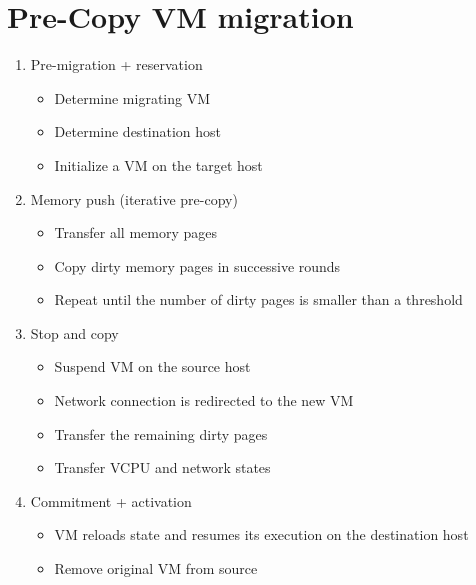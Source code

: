 \section{Pre-Copy VM migration}
\begin{enumerate}
  \item Pre-migration + reservation
  \begin{itemize}
    \item Determine migrating VM
    \item Determine destination host
    \item Initialize a VM on the target host
  \end{itemize}
  
  \item Memory push (iterative pre-copy)
  \begin{itemize}
    \item Transfer all memory pages
    \item Copy dirty memory pages in successive rounds
    \item Repeat until the number of dirty pages is smaller than a threshold
  \end{itemize}
  
  \item Stop and copy
  \begin{itemize}
    \item Suspend VM on the source host
    \item Network connection is redirected to the new VM
    \item Transfer the remaining dirty pages
    \item Transfer VCPU and network states
  \end{itemize}
  
  \item Commitment + activation
  \begin{itemize}
    \item VM reloads state and resumes its execution on the destination host
    \item Remove original VM from source 
  \end{itemize}
\end{enumerate}

